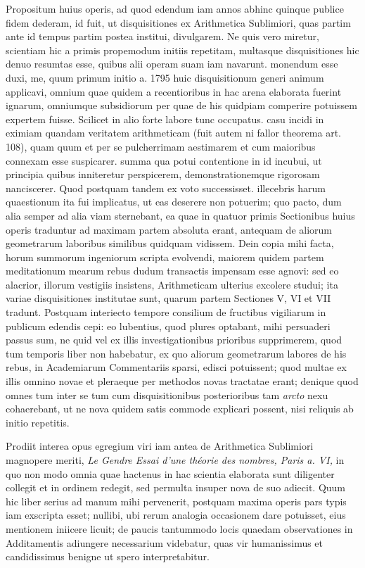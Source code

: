 Propositum huius operis, ad quod edendum iam annos abhinc quinque publice fidem dederam, id fuit, ut disquisitiones ex Arithmetica Sublimiori, quas partim ante id tempus partim postea institui, divulgarem. Ne quis vero miretur, scientiam hic a primis propemodum initiis repetitam, multasque disquisitiones hic denuo resumtas esse, quibus alii operam suam iam navarunt. monendum esse duxi, me, quum primum initio a. 1795 huic disquisitionum generi animum applicavi, omnium quae quidem a recentioribus in hac arena elaborata fuerint ignarum, omniumque subsidiorum per quae de his quidpiam comperire potuissem expertem fuisse. Scilicet in alio forte labore tunc occupatus. casu incidi in eximiam quandam veritatem arithmeticam (fuit autem ni fallor theorema art. 108), quam quum et per se pulcherrimam aestimarem et cum maioribus connexam esse suspicarer. summa qua potui contentione in id incubui, ut principia quibus inniteretur perspicerem, demonstrationemque rigorosam nanciscerer. Quod postquam tandem ex voto successisset. illecebris harum quaestionum ita fui implicatus, ut eas deserere non potuerim; quo pacto, dum alia semper ad alia viam sternebant, ea quae in quatuor primis Sectionibus huius operis traduntur ad maximam partem absoluta erant, antequam de aliorum geometrarum laboribus similibus quidquam vidissem. Dein copia mihi facta, horum summorum ingeniorum scripta evolvendi, maiorem quidem partem meditationum mearum rebus dudum transactis impensam esse agnovi: sed eo alacrior, illorum vestigiis insistens, Arithmeticam ulterius excolere studui; ita variae disquisitiones institutae sunt, quarum partem Sectiones V, VI et VII tradunt. Postquam interiecto tempore consilium de fructibus vigiliarum in publicum edendis cepi: eo lubentius, quod plures optabant, mihi persuaderi passus sum, ne quid vel ex illis investigationibus prioribus supprimerem, quod tum temporis liber non habebatur, ex quo aliorum geometrarum labores de his rebus, in Academiarum Commentariis sparsi, edisci potuissent; quod multae ex illis omnino novae et pleraeque per methodos novas tractatae erant; denique quod omnes tum inter se tum cum disquisitionibus posterioribus tam \emph{arcto} nexu cohaerebant, ut ne nova quidem satis commode explicari possent, nisi reliquis ab initio repetitis.

Prodiit interea opus egregium viri iam antea de Arithmetica Sublimiori magnopere meriti, \emph{Le Gendre Essai d'une théorie des nombres, Paris a. VI,} in quo non modo omnia quae hactenus in hac scientia elaborata sunt diligenter collegit et in ordinem redegit, sed permulta insuper nova de suo adiecit. Quum hic liber serius ad manum mihi pervenerit, postquam maxima operis pars typis iam exscripta esset; nullibi, ubi rerum analogia occasionem dare potuisset, eius mentionem iniicere licuit; de paucis tantummodo locis quaedam observationes in Additamentis adiungere necessarium videbatur, quas vir humanissimus et candidissimus benigne ut spero interpretabitur.

